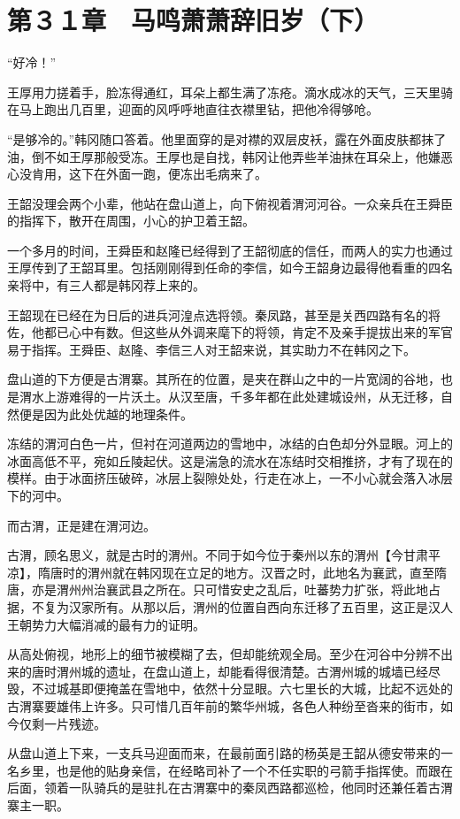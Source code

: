 \section{第３１章　马鸣萧萧辞旧岁（下）}

“好冷！”

王厚用力搓着手，脸冻得通红，耳朵上都生满了冻疮。滴水成冰的天气，三天里骑在马上跑出几百里，迎面的风呼呼地直往衣襟里钻，把他冷得够呛。

“是够冷的。”韩冈随口答着。他里面穿的是对襟的双层皮袄，露在外面皮肤都抹了油，倒不如王厚那般受冻。王厚也是自找，韩冈让他弄些羊油抹在耳朵上，他嫌恶心没肯用，这下在外面一跑，便冻出毛病来了。

王韶没理会两个小辈，他站在盘山道上，向下俯视着渭河河谷。一众亲兵在王舜臣的指挥下，散开在周围，小心的护卫着王韶。

一个多月的时间，王舜臣和赵隆已经得到了王韶彻底的信任，而两人的实力也通过王厚传到了王韶耳里。包括刚刚得到任命的李信，如今王韶身边最得他看重的四名亲将中，有三人都是韩冈荐上来的。

王韶现在已经在为日后的进兵河湟点选将领。秦凤路，甚至是关西四路有名的将佐，他都已心中有数。但这些从外调来麾下的将领，肯定不及亲手提拔出来的军官易于指挥。王舜臣、赵隆、李信三人对王韶来说，其实助力不在韩冈之下。

盘山道的下方便是古渭寨。其所在的位置，是夹在群山之中的一片宽阔的谷地，也是渭水上游难得的一片沃土。从汉至唐，千多年都在此处建城设州，从无迁移，自然便是因为此处优越的地理条件。

冻结的渭河白色一片，但衬在河道两边的雪地中，冰结的白色却分外显眼。河上的冰面高低不平，宛如丘陵起伏。这是湍急的流水在冻结时交相推挤，才有了现在的模样。由于冰面挤压破碎，冰层上裂隙处处，行走在冰上，一不小心就会落入冰层下的河中。

而古渭，正是建在渭河边。

古渭，顾名思义，就是古时的渭州。不同于如今位于秦州以东的渭州【今甘肃平凉】，隋唐时的渭州就在韩冈现在立足的地方。汉晋之时，此地名为襄武，直至隋唐，亦是渭州州治襄武县之所在。只可惜安史之乱后，吐蕃势力扩张，将此地占据，不复为汉家所有。从那以后，渭州的位置自西向东迁移了五百里，这正是汉人王朝势力大幅消减的最有力的证明。

从高处俯视，地形上的细节被模糊了去，但却能统观全局。至少在河谷中分辨不出来的唐时渭州城的遗址，在盘山道上，却能看得很清楚。古渭州城的城墙已经尽毁，不过城基即便掩盖在雪地中，依然十分显眼。六七里长的大城，比起不远处的古渭寨要雄伟上许多。只可惜几百年前的繁华州城，各色人种纷至沓来的街市，如今仅剩一片残迹。

从盘山道上下来，一支兵马迎面而来，在最前面引路的杨英是王韶从德安带来的一名乡里，也是他的贴身亲信，在经略司补了一个不任实职的弓箭手指挥使。而跟在后面，领着一队骑兵的是驻扎在古渭寨中的秦凤西路都巡检，他同时还兼任着古渭寨主一职。

